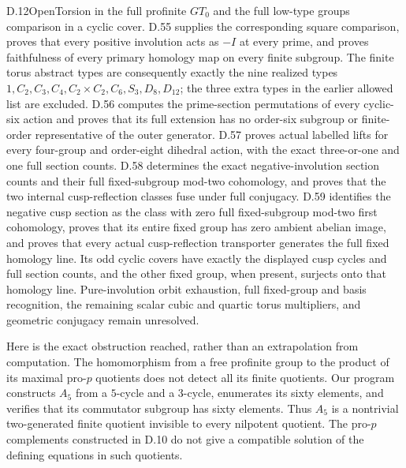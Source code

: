 \begin{claim}{D.12}{Open}{Torsion in the full profinite $GT_0$ and the full low-type groups}
comparison in a cyclic cover. D.55 supplies the corresponding square comparison, proves that every positive involution acts as $-I$ at every prime, and proves faithfulness of every primary homology map on every finite subgroup. The finite torus abstract types are consequently exactly the nine realized types $1,C_2,C_3,C_4,C_2\times C_2,C_6,S_3,D_8,D_{12}$; the three extra types in the earlier allowed list are excluded. D.56 computes the prime-section permutations of every cyclic-six action and proves that its full extension has no order-six subgroup or finite-order representative of the outer generator. D.57 proves actual labelled lifts for every four-group and order-eight dihedral action, with the exact three-or-one and one full section counts. D.58 determines the exact negative-involution section counts and their full fixed-subgroup mod-two cohomology, and proves that the two internal cusp-reflection classes fuse under full conjugacy. D.59 identifies the negative cusp section as the class with zero full fixed-subgroup mod-two first cohomology, proves that its entire fixed group has zero ambient abelian image, and proves that every actual cusp-reflection transporter generates the full fixed homology line. Its odd cyclic covers have exactly the displayed cusp cycles and full section counts, and the other fixed group, when present, surjects onto that homology line. Pure-involution orbit exhaustion, full fixed-group and basis recognition, the remaining scalar cubic and quartic torus multipliers, and geometric conjugacy remain unresolved.
\end{claim}
Here is the exact obstruction reached, rather than an extrapolation from computation. The homomorphism from a free profinite group to the product of its maximal pro-$p$ quotients does not detect all its finite quotients. Our program constructs $A_5$ from a $5$-cycle and a $3$-cycle, enumerates its sixty elements, and verifies that its commutator subgroup has sixty elements. Thus $A_5$ is a nontrivial two-generated finite quotient invisible to every nilpotent quotient. The pro-$p$ complements constructed in D.10 do not give a compatible solution of the defining equations in such quotients.

